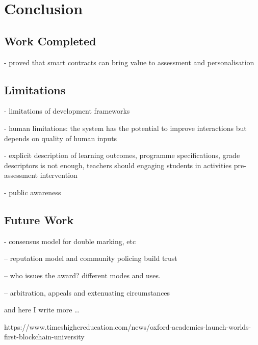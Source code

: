 \chapter{Conclusion}

\section{Work Completed}

- proved that smart contracts can bring value to assessment and personalisation

\section{Limitations}

- limitations of development frameworks

- human limitations: the system has the potential to improve interactions but depends on quality of human inputs 

- explicit description of learning outcomes, programme specifications, grade descriptors is not enough, teachers should
engaging students in activities pre-assessment intervention \citep{bryan2006innovative}

- public awareness

\section{Future Work}


- consensus model for double marking, etc

-- reputation model and community policing build trust

-- who issues the award? different modes and uses. 

-- arbitration, appeals and extenuating circumstances



and here I write more \dots

https://www.timeshighereducation.com/news/oxford-academics-launch-worlds-first-blockchain-university